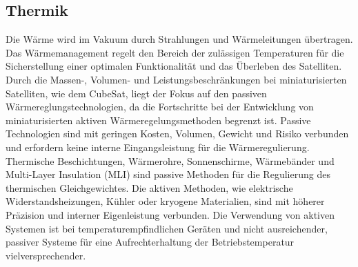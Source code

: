 		\subsection{Thermik}%
Die Wärme wird im Vakuum durch Strahlungen und Wärmeleitungen übertragen. Das Wärmemanagement regelt den Bereich der zulässigen Temperaturen für die Sicherstellung einer optimalen Funktionalität und das Überleben des Satelliten. Durch die Massen-, Volumen- und Leistungsbeschränkungen bei miniaturisierten Satelliten, wie dem CubeSat, liegt der Fokus auf den passiven Wärmereglungstechnologien, da die Fortschritte bei der Entwicklung von miniaturisierten aktiven Wärmeregelungsmethoden begrenzt ist. Passive Technologien sind mit geringen Kosten, Volumen, Gewicht und Risiko verbunden und erfordern keine interne Eingangsleistung für die Wärmeregulierung. Thermische Beschichtungen, Wärmerohre, Sonnenschirme, Wärmebänder und Multi-Layer Insulation (MLI) sind passive Methoden für die Regulierung des thermischen Gleichgewichtes. Die aktiven Methoden, wie elektrische Widerstandsheizungen, Kühler oder kryogene Materialien, sind mit höherer Präzision und interner Eigenleistung verbunden. Die Verwendung von aktiven Systemen ist bei temperaturempfindlichen Geräten und nicht ausreichender, passiver Systeme für eine Aufrechterhaltung der Betriebstemperatur vielversprechender. \cite[S. 109 - 120]{NASA.Sota.2018} 

